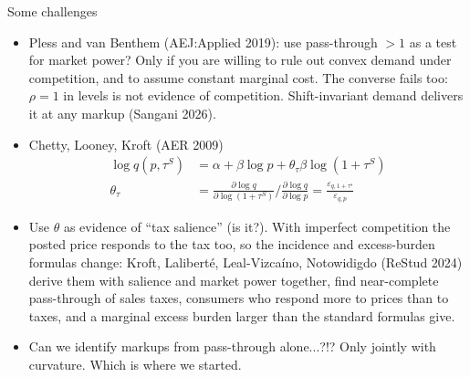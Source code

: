 \documentclass[aspectratio=169,10pt]{beamer}
\begin{document}
\begin{frame}{Some challenges}
\small
\begin{itemize}
\item Pless and van Benthem (AEJ:Applied 2019): use pass-through $>1$ as a test for market power? Only if you are willing to rule out convex demand under competition, and to assume constant marginal cost. The converse fails too: $\rho = 1$ in levels is not evidence of competition. Shift-invariant demand delivers it at any markup (Sangani 2026).
\item Chetty, Looney, Kroft (AER 2009)
\begin{align*}
\log q\left(p, \tau^S\right)&=\alpha+\beta \log p+\theta_\tau \beta \log \left(1+\tau^S\right)\\
\theta_\tau&=\frac{\partial \log q}{\partial \log \left(1+\tau^S\right)} / \frac{\partial \log q}{\partial \log p}=\frac{\varepsilon_{q, 1+\tau^s}}{\varepsilon_{q, p}}
\end{align*}
\item Use $\theta$ as evidence of ``tax salience'' (is it?). With imperfect competition the posted price responds to the tax too, so the incidence and excess-burden formulas change: Kroft, Lalibert\'e, Leal-Vizca\'ino, Notowidigdo (ReStud 2024) derive them with salience and market power together, find near-complete pass-through of sales taxes, consumers who respond more to prices than to taxes, and a marginal excess burden larger than the standard formulas give.
\item Can we identify markups from pass-through alone...?!? Only jointly with curvature. Which is where we started.
\end{itemize}
\end{frame}
\end{document}

